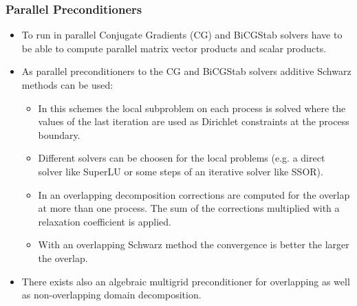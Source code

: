 
\begin{frame}
\frametitle{Parallel Preconditioners}
\begin{itemize}
\item To run in parallel Conjugate Gradients (CG) and BiCGStab solvers have to be able to compute parallel matrix vector
products and scalar products.
\item As parallel preconditioners to the CG and BiCGStab solvers additive Schwarz methods can be used:
\begin{itemize}
\item In this schemes the local subproblem on each process is solved
where the values of the last iteration are used as Dirichlet constraints at the process boundary.
\item Different solvers can be choosen for the local problems (e.g. a direct solver like SuperLU or some steps of an
iterative solver like SSOR).
\item In an overlapping decomposition corrections are computed for the overlap at more than one process. The sum of the corrections multiplied with a relaxation
coefficient is applied.
\item With an overlapping Schwarz method the convergence is better the larger the overlap.
\end{itemize}
\item There exists also an algebraic multigrid preconditioner for overlapping as well as non-overlapping domain decomposition.
\end{itemize}
\end{frame}


